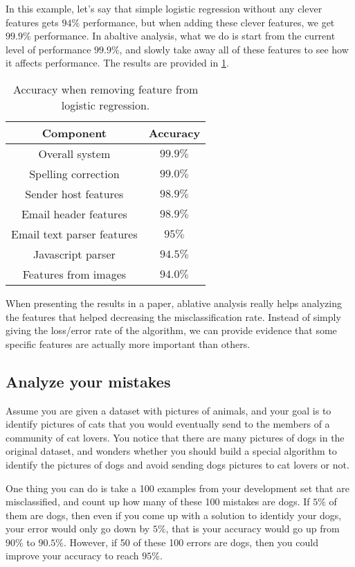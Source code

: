 In this example, let's say that simple logistic regression without any clever features gets
$94\%$ performance, but when adding these clever features, we get $99.9\%$ performance. In
abaltive analysis, what we do is start from the current level of performance $99.9\%$, and
slowly take away all of these features to see how it affects performance. The results are
provided in \cref{tab:ablation}.

\begin{table}[!h]
  \centering
  \caption{
    \label{tab:ablation} Accuracy when removing feature from logistic regression.
  }
  \begin{tabular}{cc}
    \toprule
    \textbf{Component} & \textbf{Accuracy}\\
    \midrule
    Overall system & $99.9\%$\\
    Spelling correction & $99.0\%$\\
    Sender host features & $98.9\%$\\
    Email header features & $98.9\%$\\
    Email text parser features & $95\%$\\
    Javascript parser & $94.5\%$\\
    Features from images & $94.0\%$\\
    \bottomrule
  \end{tabular}
\end{table}

When presenting the results in a paper, ablative analysis really helps analyzing the features
that helped decreasing the misclassification rate. Instead of simply giving the loss/error
rate of the algorithm, we can provide evidence that some specific features are actually more
important than others.

\subsection{Analyze your mistakes}
Assume you are given a dataset with pictures of animals, and your goal is to identify pictures
of cats that you would eventually send to the members of a community of cat lovers. You
notice that there are many pictures of dogs in the original dataset, and wonders whether
you should build a special algorithm to identify the pictures of dogs and avoid sending dogs
pictures to cat lovers or not.

One thing you can do is take a 100 examples from your development set that are
misclassified, and count up how many of these 100 mistakes are dogs. If $5\%$ of them are dogs,
then even if you come up with a solution to identidy your dogs, your error would only go
down by $5\%$, that is your accuracy would go up from $90\%$ to $90.5\%$. However, if 50 of these
100 errors are dogs, then you could improve your accuracy to reach $95\%$.

